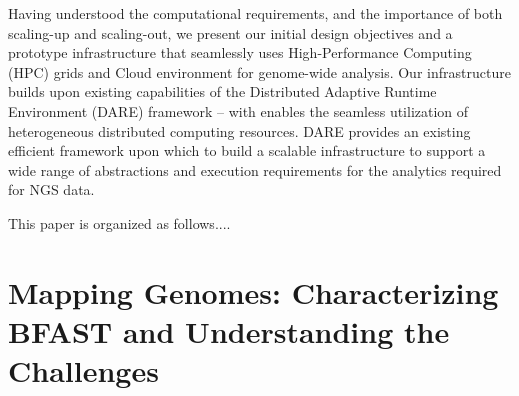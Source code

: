 \documentclass{acm_proc_article-sp}
\begin{document}
Having understood the computational requirements, and the importance
of both scaling-up and scaling-out, we present our initial design
objectives and a prototype infrastructure that seamlessly uses
High-Performance Computing (HPC) grids and Cloud environment for
genome-wide analysis.  Our infrastructure builds upon existing
capabilities of the Distributed Adaptive Runtime Environment (DARE)
framework -- with enables the seamless utilization of heterogeneous
distributed computing resources.  DARE provides an existing efficient
framework upon which to build a scalable infrastructure to support a
wide range of abstractions and execution requirements for the
analytics required for NGS data.

This paper is organized as follows....





\section{Mapping Genomes: Characterizing BFAST and Understanding
  the Challenges}
\end{document}
